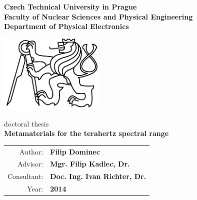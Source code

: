 
\begin{center}
\textbf{
Czech Technical University in Prague\\
Faculty of Nuclear Sciences and Physical Engineering\\ 
Department of Physical Electronics\\
 }
 \vspace{1cm}

\includegraphics[width=5cm]{img/LogoCVUT}
\vspace{4cm}

\large{doctoral thesis}\\
\vspace{5mm}
\textbf{\huge Metamaterials for the terahertz spectral range\\}
\end{center}

\date{ } 			
 
 \vfill
 \begin{tabular}{rl}
  Author: 	&\textbf{Filip Dominec}\\
  Advisor: 	&\textbf{Mgr. Filip Kadlec, Dr.}\\
  Consultant: 	&\textbf{Doc. Ing. Ivan Richter, Dr.}\\ 
  Year:		&\textbf{2014}\\
  \end{tabular}

\thispagestyle{empty}

\tableofcontents
